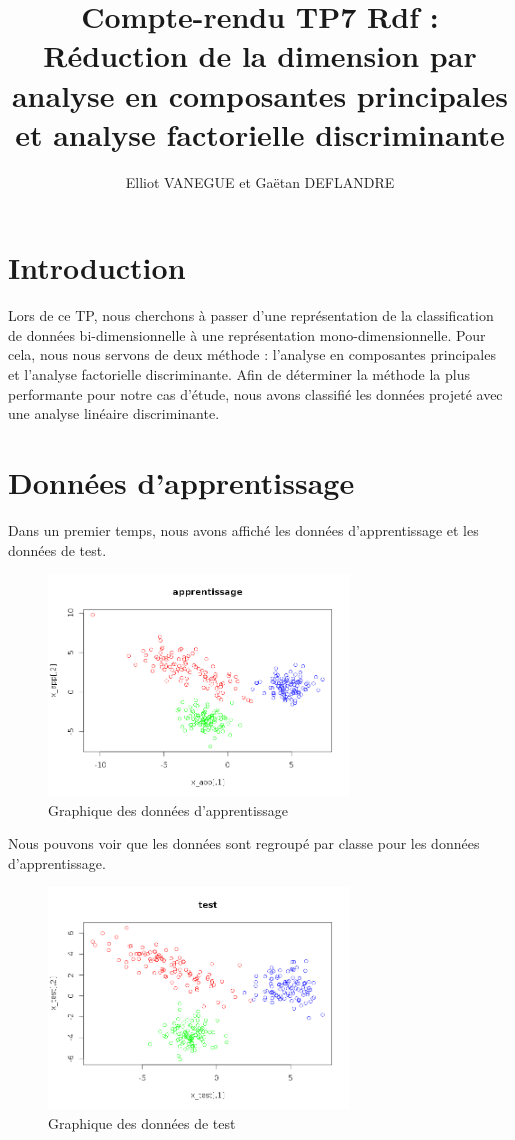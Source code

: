 \documentclass[a4paper,11pt]{article}
\title{Compte-rendu TP7 Rdf : Réduction de la dimension par analyse en composantes principales et analyse factorielle discriminante}
\author{Elliot VANEGUE et Gaëtan DEFLANDRE}
\begin{document}


  \maketitle
  
  \mbox{}
  \newpage
  \clearpage
  
  \section*{Introduction}
  Lors de ce TP, nous cherchons à passer d'une représentation de la classification de données
  bi-dimensionnelle à une représentation mono-dimensionnelle. Pour cela, nous nous servons de
  deux méthode : l'analyse en composantes principales et l'analyse factorielle discriminante.
  Afin de déterminer la méthode la plus performante pour notre cas d'étude, nous avons classifié
  les données projeté avec une analyse linéaire discriminante.
 
  \section{Données d'apprentissage}
  Dans un premier temps, nous avons affiché les données d'apprentissage et les données de test.
  
  \begin{figure}[H]
    \center
   \includegraphics[width=8cm]{donnees_apprentissage.png}
   \caption{Graphique des données d'apprentissage}
  \end{figure}
  
  Nous pouvons voir que les données sont regroupé par classe pour les données d'apprentissage.
  
  \begin{figure}[H]
  \center
   \includegraphics[width=8cm]{donnees_test.png}
   \caption{Graphique des données de test}
  \end{figure}
  
\end{document}
